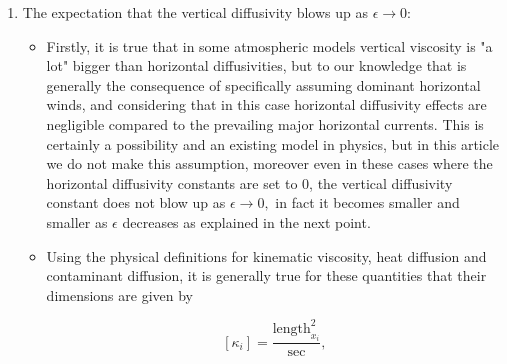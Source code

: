 \documentclass[11pt]{article}
\begin{document}
\begin{enumerate}
\begin{gather}
 \mathbf{K}
 =
  \begin{bmatrix}
    1 & 0 & 0 \\ 0 & 1 & 0 \\ 0 & 0 & \epsilon^2.
  \end{bmatrix}
\end{gather}
  
  \item The expectation that the vertical diffusivity blows up as $\epsilon \to 0$:
  \begin{itemize}
    \item Firstly, it is true that in some atmospheric models vertical viscosity is "a lot" bigger than horizontal diffusivities, but to our knowledge that is generally the consequence of specifically assuming dominant horizontal winds, and considering that in this case horizontal diffusivity effects are negligible compared to the prevailing major horizontal currents. This is certainly a possibility and an existing model in physics, but in this article we do not make this assumption, moreover even in these cases where the horizontal diffusivity constants are set to 0, the vertical diffusivity constant does not blow up as $\epsilon \to 0,$ in fact it becomes smaller and smaller as $\epsilon$ decreases as explained in the next point.
    \item Using the physical definitions for kinematic viscosity, heat diffusion and contaminant diffusion, it is generally true for these quantities that their dimensions are given by
    
    $$ [\kappa_i] = \frac{\text{length}_{x_i}^2}{\text{sec}}, $$
    

\end{itemize}
\end{enumerate}
\end{document}
